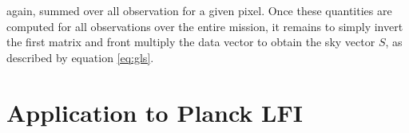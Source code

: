 \documentclass{aa}
\begin{document}
again, summed over all observation for a given pixel. Once these quantities are computed for all observations over the entire mission, it remains to simply invert the first matrix and front multiply the data vector to obtain the sky vector $S$, as described by equation \ref{eq:gls}.








\section{Application to Planck LFI}
\label{sec:lfi}
\end{document}
